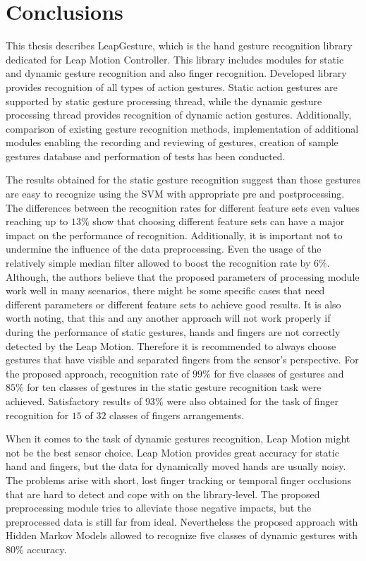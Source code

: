 \chapter{Conclusions}

This thesis describes LeapGesture, which is the hand gesture recognition library dedicated for Leap Motion Controller.
This library includes modules for static and dynamic gesture recognition and also finger recognition.
Developed library provides recognition of all types of action gestures.
Static action gestures are supported by static gesture processing thread, while the dynamic gesture processing thread provides recognition of dynamic action gestures.
Additionally, comparison of existing gesture recognition methods, implementation of additional modules enabling the recording and reviewing of gestures, creation of sample gestures database and performation of tests has been conducted.

The results obtained for the static gesture recognition suggest than those gestures are easy to recognize using the SVM with appropriate pre and postprocessing.
The differences between the recognition rates for different feature sets even values reaching up to $13\%$ show that choosing different feature sets can have a major impact on the performance of recognition.
Additionally, it is important not to undermine the influence of the data preprocessing. 
Even the usage of the relatively simple median filter allowed to boost the recognition rate by $6\%$.
Although, the authors believe that the proposed parameters of processing module work well in many scenarios, there might be some specific cases that need different parameters or different feature sets to achieve good results.
It is also worth noting, that this and any another approach will not work properly if during the performance of static gestures, hands and fingers are not correctly detected by the Leap Motion.
Therefore it is recommended to always choose gestures that have visible and separated fingers from the sensor's perspective.
For the proposed approach, recognition rate of $99\%$ for five classes of gestures and $85\%$ for ten classes of gestures in the static gesture recognition task were achieved. Satisfactory results of $93\%$ were also obtained for the task of finger recognition for $15$ of $32$ classes of fingers arrangements.

When it comes to the task of dynamic gestures recognition, Leap Motion might not be the best sensor choice.
Leap Motion provides great accuracy for static hand and fingers, but the data for dynamically moved hands are usually noisy.
The problems arise with short, lost finger tracking or temporal finger occlusions that are hard to detect and cope with on the library-level.
The proposed preprocessing module tries to alleviate those negative impacts, but the preprocessed data is still far from ideal.
Nevertheless the proposed approach with Hidden Markov Models allowed to recognize five classes of dynamic gestures with $80\%$ accuracy.

